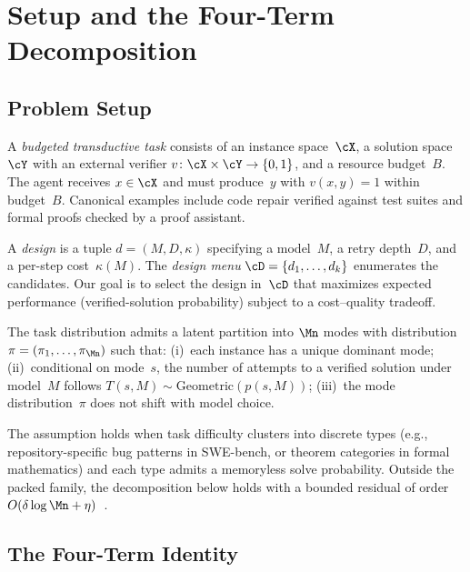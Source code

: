 
\section{Setup and the Four-Term Decomposition}
\label{sec:decomposition}

\subsection{Problem Setup}
\label{sec:setup}

A \emph{budgeted transductive task} consists of an instance space~$\cX$,
a solution space~$\cY$ with an external verifier
$v\colon \cX \times \cY \to \{0,1\}$, and a resource budget~$B$.
The agent receives $x \in \cX$ and must produce~$y$ with $v(x,y)=1$
within budget~$B$.  Canonical examples include code repair verified against
test suites and formal proofs checked by a proof assistant.

A \emph{design} is a tuple $d = (M, D, \kappa)$ specifying a model~$M$,
a retry depth~$D$, and a per-step cost~$\kappa(M)$.  The \emph{design
menu} $\cD = \{d_1,\ldots,d_k\}$ enumerates the candidates.  Our goal is
to select the design in~$\cD$ that maximizes expected performance
(verified-solution probability) subject to a cost--quality tradeoff.

\begin{assumption}
\label{ass:packed}
The task distribution admits a latent partition into $\Mn$ modes
with distribution $\pi = (\pi_1,\ldots,\pi_{\Mn})$ such that:
(i)~each instance has a unique dominant mode;
(ii)~conditional on mode~$s$, the number of attempts to a verified
solution under model~$M$ follows
$T(s,M) \sim \mathrm{Geometric}(p(s,M))$;
(iii)~the mode distribution~$\pi$ does not shift with model choice.
\end{assumption}

The assumption holds when task difficulty clusters into discrete types
(e.g., repository-specific bug patterns in SWE-bench, or theorem
categories in formal mathematics) and each type admits a memoryless solve
probability.  Outside the packed family, the decomposition below holds with
a bounded residual of order
$O(\delta \log \Mn + \eta)$~\citep{beneventano2026framework}.

\subsection{The Four-Term Identity}
\label{sec:four-term}

